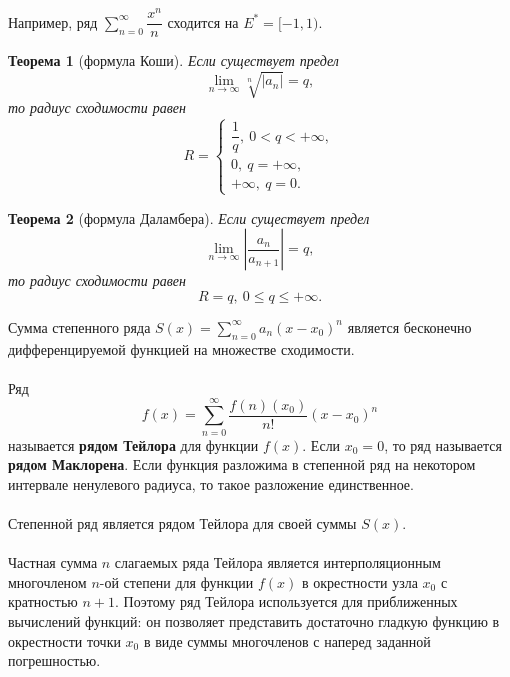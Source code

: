 \documentclass[a4paper, 12pt]{report}
\numberwithin{equation}{section}
\renewcommand{\leq}{\leqslant}
\newtheorem*{theorem}{Теорема}
\begin{document}
	\\\\
	Например, ряд $\sum\limits_{n=0}^\infty \dfrac{x^n}{n}$ сходится на $E^*=[-1,1)$.
	\begin{theorem}
		[формула Коши]
		Если существует предел
		\begin{equation*}
			\lim\limits_{n\to \infty} \sqrt[n]{|a_n|} = q,
		\end{equation*}
		то радиус сходимости равен
		\begin{equation*}
			R = \begin{cases}
				\dfrac 1 q,\ 0 < q < +\infty,\\
				0,\ q = +\infty,\\
				+\infty,\ q = 0.
			\end{cases}
		\end{equation*}
	\end{theorem}
	\begin{theorem}
		[формула Даламбера]
		Если существует предел
		\begin{equation*}
			\lim\limits_{n\to \infty} \left|\dfrac{a_n}{a_{n+1}}\right| = q,
		\end{equation*}
		то радиус сходимости равен
		\begin{equation*}
			R = q,\ 0 \leq q \leq +\infty.
		\end{equation*}
	\end{theorem}
	\noindent
	Сумма степенного ряда $S(x) = \sum\limits_{n=0}^\infty a_n (x-x_0)^n$ является бесконечно дифференцируемой функцией на множестве сходимости.\\\\
	Ряд
	\begin{equation}
		f(x) = \sum_{n=0}^\infty \dfrac{f{(n)}(x_0)}{n!}(x-x_0)^n
	\end{equation}
	называется \textbf{рядом Тейлора} для функции $f(x)$. Если $x_0 = 0$, то ряд называется \textbf{рядом Маклорена}. Если функция разложима в степенной ряд на некотором интервале ненулевого радиуса, то такое разложение единственное.
	\\\\
	Степенной ряд является рядом Тейлора для своей суммы $S(x)$. 
	\\\\
	Частная сумма $n$ слагаемых ряда Тейлора является интерполяционным многочленом $n$-ой степени для функции $f(x)$ в окрестности узла $x_0$ с кратностью $n+1$. Поэтому ряд Тейлора используется для приближенных вычислений функций: он позволяет представить достаточно гладкую функцию в окрестности точки $x_0$ в виде суммы многочленов с наперед заданной погрешностью.
\end{document}
